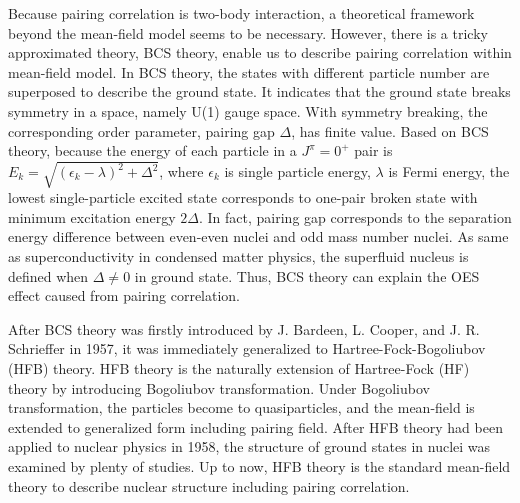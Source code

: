 \documentclass[11pt]{book} %
\begin{document}
Because pairing correlation is two-body interaction, a theoretical framework beyond the mean-field model seems to be necessary. However, there is a tricky approximated theory, BCS theory, enable us to describe pairing correlation within mean-field model. In BCS theory, the states with different particle number are superposed to describe the ground state. It indicates that the ground state breaks symmetry in a space, namely U(1) gauge space. With symmetry breaking, the corresponding order parameter, pairing gap $\Delta$, has finite value. Based on BCS theory, because the energy of each particle in a $J^{\pi}=0^+$ pair is $E_k=\sqrt{(\epsilon_k-\lambda)^2+\Delta^2}$, where $\epsilon_k$ is single particle energy, $\lambda$ is Fermi energy, the lowest single-particle excited state corresponds to one-pair broken state with minimum excitation energy $2\Delta$. In fact, pairing gap corresponds to the separation energy difference between even-even nuclei and odd mass number nuclei. As same as superconductivity in condensed matter physics, the superfluid nucleus is defined when $\Delta\neq0$ in ground state. Thus, BCS theory can explain the OES effect caused from pairing correlation.

After BCS theory was firstly introduced by J. Bardeen, L. Cooper, and J. R. Schrieffer in 1957, it was immediately generalized to Hartree-Fock-Bogoliubov (HFB) theory. HFB theory is the naturally extension of Hartree-Fock (HF) theory by introducing Bogoliubov transformation. Under Bogoliubov transformation, the particles become to quasiparticles, and the mean-field is extended to generalized form including pairing field. After HFB theory had been applied to nuclear physics in 1958, the structure of ground states in nuclei was examined by plenty of studies. Up to now, HFB theory is the standard mean-field theory to describe nuclear structure including pairing correlation.



\end{document}
